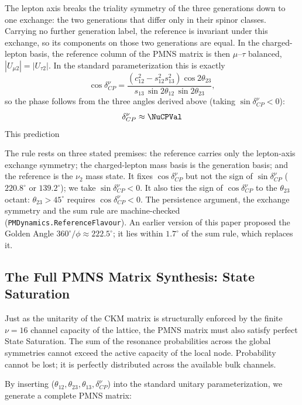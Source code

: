 The lepton axis breaks the triality symmetry of the three generations down to one exchange: the two generations that differ only in their spinor classes. Carrying no further generation label, the reference is invariant under this exchange, so its components on those two generations are equal. In the charged-lepton basis, the reference column of the PMNS matrix is then $\mu$--$\tau$ balanced, $|U_{\mu 2}| = |U_{\tau 2}|$. In the standard parameterization this is exactly
\begin{equation}
    \cos\delta_{CP}^\nu = \frac{(c_{12}^2 - s_{12}^2 s_{13}^2)\cos 2\theta_{23}}{s_{13}\,\sin 2\theta_{12}\,\sin 2\theta_{23}},
\end{equation}
so the phase follows from the three angles derived above (taking $\sin\delta_{CP}^\nu < 0$):
\begin{equation}
    \delta_{CP}^\nu \approx \mathbf{\NuCPVal}
\end{equation}
This prediction \NuCPAccText

The rule rests on three stated premises: the reference carries only the lepton-axis exchange symmetry; the charged-lepton mass basis is the generation basis; and the reference is the $\nu_2$ mass state. It fixes $\cos\delta_{CP}^\nu$ but not the sign of $\sin\delta_{CP}^\nu$ ($220.8^\circ$ or $139.2^\circ$); we take $\sin\delta_{CP}^\nu < 0$. It also ties the sign of $\cos\delta_{CP}^\nu$ to the $\theta_{23}$ octant: $\theta_{23} > 45^\circ$ requires $\cos\delta_{CP}^\nu < 0$. The persistence argument, the exchange symmetry and the sum rule are machine-checked (\texttt{PMDynamics.ReferenceFlavour}). An earlier version of this paper proposed the Golden Angle $360^\circ/\phi \approx 222.5^\circ$; it lies within $1.7^\circ$ of the sum rule, which replaces it.

\subsection{The Full PMNS Matrix Synthesis: State Saturation}

Just as the unitarity of the CKM matrix is structurally enforced by the finite $\nu=16$ channel capacity of the lattice, the PMNS matrix must also satisfy perfect State Saturation. The sum of the resonance probabilities across the global symmetries cannot exceed the active capacity of the local node. Probability cannot be lost; it is perfectly distributed across the available bulk channels.

By inserting ($\theta_{12}, \theta_{23}, \theta_{13}, \delta_{CP}^\nu$) into the standard unitary parameterization, we generate a complete PMNS matrix:

